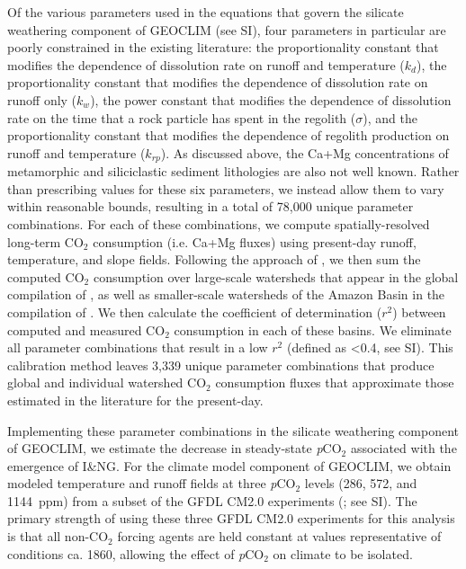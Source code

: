\documentclass[11pt,letterpaper]{article}
\newcommand{\pCOtwo}{\textit{p}CO$_{2}$\xspace}
\newcommand{\COtwo}{CO$_{2}$\xspace}
\begin{document}
Of the various parameters used in the equations that govern the silicate weathering component of GEOCLIM (see SI), four parameters in particular are poorly constrained in the existing literature: the proportionality constant that modifies the dependence of dissolution rate on runoff and temperature ($k_{d}$), the proportionality constant that modifies the dependence of dissolution rate on runoff only ($k_{w}$), the power constant that modifies the dependence of dissolution rate on the time that a rock particle has spent in the regolith ($\sigma$), and the proportionality constant that modifies the dependence of regolith production on runoff and temperature ($k_{rp}$). As discussed above, the Ca+Mg concentrations of metamorphic and siliciclastic sediment lithologies are also not well known. Rather than prescribing values for these six parameters, we instead allow them to vary within reasonable bounds, resulting in a total of 78,000 unique parameter combinations. For each of these combinations, we compute spatially-resolved long-term \COtwo consumption (i.e. Ca+Mg fluxes) using present-day runoff, temperature, and slope fields. Following the approach of \citet{Maffre2018a}, we then sum the computed \COtwo consumption over large-scale watersheds that appear in the global compilation of \citet{Gaillardet1999a}, as well as smaller-scale watersheds of the Amazon Basin in the compilation of \citet{Moquet2018a}. We then calculate the coefficient of determination ($r^{2}$) between computed and measured \COtwo consumption in each of these basins. We eliminate all parameter combinations that result in a low $r^{2}$ (defined as \textless0.4, see SI). This calibration method leaves 3,339 unique parameter combinations that produce global and individual watershed \COtwo consumption fluxes that approximate those estimated in the literature for the present-day.

Implementing these parameter combinations in the silicate weathering component of GEOCLIM, we estimate the decrease in steady-state \pCOtwo associated with the emergence of I\&NG. For the climate model component of GEOCLIM, we obtain modeled temperature and runoff fields at three \pCOtwo levels (286, 572, and 1144~ppm) from a subset of the GFDL CM2.0 experiments (\citealp{Delworth2006a, Delworth2006b}; see SI). The primary strength of using these three GFDL CM2.0 experiments for this analysis is that all non-\COtwo forcing agents are held constant at values representative of conditions ca. 1860, allowing the effect of \pCOtwo on climate to be isolated.
\end{document}
